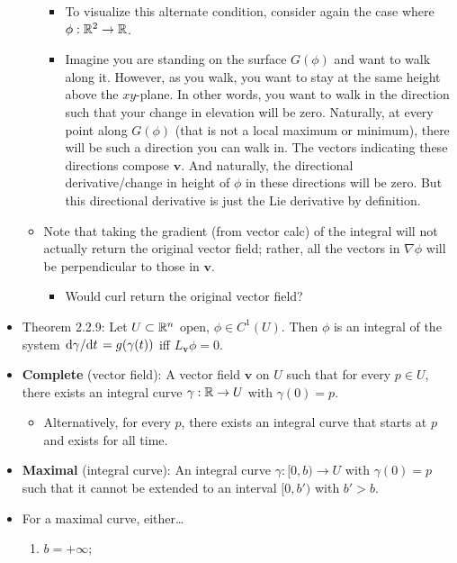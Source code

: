 \documentclass[../notes.tex]{subfiles}
\begin{document}
\begin{itemize}
\begin{itemize}
        \begin{itemize}
            \item To visualize this alternate condition, consider again the case where $\phi:\mathbb{R}^2\to\mathbb{R}$.
            \item Imagine you are standing on the surface $G(\phi)$ and want to walk along it. However, as you walk, you want to stay at the same height above the $xy$-plane. In other words, you want to walk in the direction such that your change in elevation will be zero. Naturally, at every point along $G(\phi)$ (that is not a local maximum or minimum), there will be such a direction you can walk in. The vectors indicating these directions compose $\bm{v}$. And naturally, the directional derivative/change in height of $\phi$ in these directions will be zero. But this directional derivative is just the Lie derivative by definition.
        \end{itemize}
        \item Note that taking the gradient (from vector calc) of the integral will not actually return the original vector field; rather, all the vectors in $\nabla\phi$ will be perpendicular to those in $\bm{v}$.
        \begin{itemize}
            \item Would curl return the original vector field?
        \end{itemize}
    \end{itemize}
    \item Theorem 2.2.9: Let $U\subset\mathbb{R}^n$ open, $\phi\in C^1(U)$. Then $\phi$ is an integral of the system $\dv*{\gamma}{t}=g(\gamma(t))$ iff $L_{\bm{v}}\phi=0$.
    \item \textbf{Complete} (vector field): A vector field $\bm{v}$ on $U$ such that for every $p\in U$, there exists an integral curve $\gamma:\mathbb{R}\to U$ with $\gamma(0)=p$.
    \begin{itemize}
        \item Alternatively, for every $p$, there exists an integral curve that starts at $p$ and exists for all time.
    \end{itemize}
    \item \textbf{Maximal} (integral curve): An integral curve $\gamma:[0,b)\to U$ with $\gamma(0)=p$ such that it cannot be extended to an interval $[0,b')$ with $b'>b$.
    \item For a maximal curve, either\dots
    \begin{enumerate}
        \item $b=+\infty$;

\end{enumerate}
\end{itemize}
\end{document}
